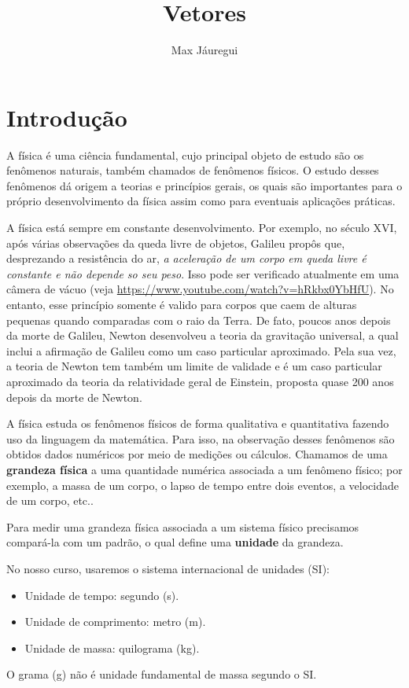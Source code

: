\documentclass[12pt, a4paper]{article}
\title{Vetores}
\author{Max Jáuregui}
\begin{document}
\maketitle

\section{Introdução}

A física é uma ciência fundamental, cujo principal objeto de estudo são os fenômenos naturais, também chamados de fenômenos físicos. O estudo desses fenômenos dá origem a teorias e princípios gerais, os quais são importantes para o próprio desenvolvimento da física assim como para eventuais aplicações práticas. 

A física está sempre em constante desenvolvimento. Por exemplo, no século XVI, após várias observações da queda livre de objetos, Galileu propôs que, desprezando a resistência do ar, \textit{a aceleração de um corpo em queda livre é constante e não depende so seu peso}. Isso pode ser verificado atualmente em uma câmera de vácuo (veja \url{https://www.youtube.com/watch?v=hRkbx0YbHfU}). No entanto, esse princípio somente é valido para corpos que caem de alturas pequenas quando comparadas com o raio da Terra. De fato, poucos anos depois da morte de Galileu, Newton desenvolveu a teoria da gravitação universal, a qual inclui a afirmação de Galileu como um caso particular aproximado. Pela sua vez, a teoria de Newton tem também um limite de validade e é um caso particular aproximado da teoria da relatividade geral de Einstein, proposta quase 200 anos depois da morte de Newton. 

A física estuda os fenômenos físicos de forma qualitativa e quantitativa fazendo uso da linguagem da matemática. Para isso, na observação desses fenômenos são obtidos dados numéricos por meio de medições ou cálculos. Chamamos de uma \textbf{grandeza física} a uma quantidade numérica associada a um fenômeno físico; por exemplo, a massa de um corpo, o lapso de tempo entre dois eventos, a velocidade de um corpo, etc..

Para medir uma grandeza física associada a um sistema físico precisamos compará-la com um padrão, o qual define uma \textbf{unidade} da grandeza.

No nosso curso, usaremos o sistema internacional de unidades (SI):
\begin{itemize}
	\item Unidade de tempo: segundo (s).
	\item Unidade de comprimento: metro (m).
	\item Unidade de massa: quilograma (kg). 
\end{itemize}
O grama (g) não é unidade fundamental de massa segundo o SI.
\end{document}
